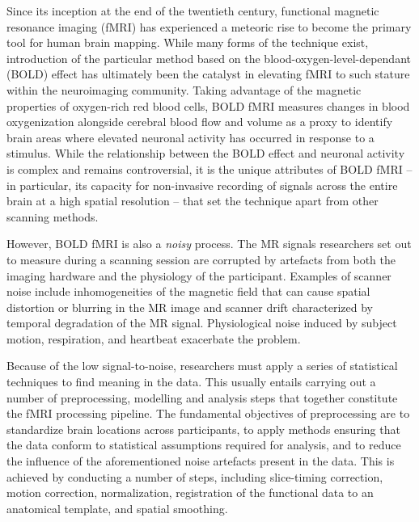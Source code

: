 Since its inception at the end of the twentieth century, functional magnetic resonance imaging (fMRI) has experienced a meteoric rise to become the primary tool for human brain mapping. While many forms of the technique exist, introduction of the particular method based on the blood-oxygen-level-dependant (BOLD) effect has ultimately been the catalyst in elevating fMRI to such stature within the neuroimaging community. Taking advantage of the magnetic properties of oxygen-rich red blood cells, BOLD fMRI measures changes in blood oxygenization alongside cerebral blood flow and volume as a proxy to identify brain areas where elevated neuronal activity has occurred in response to a stimulus. While the relationship between the BOLD effect and neuronal activity is complex and remains controversial, it is the unique attributes of BOLD fMRI -- in particular, its capacity for non-invasive recording of signals across the entire brain at a high spatial resolution -- that set the technique apart from other scanning methods.

However, BOLD fMRI is also a \textit{noisy} process. The MR signals researchers set out to measure during a scanning session are corrupted by artefacts from both the imaging hardware and the physiology of the participant. Examples of scanner noise include inhomogeneities of the magnetic field that can cause spatial distortion or blurring in the MR image and scanner drift characterized by temporal degradation of the MR signal. Physiological noise induced by subject motion, respiration, and heartbeat exacerbate the problem. 

Because of the low signal-to-noise, researchers must apply a series of statistical techniques to find meaning in the data. This usually entails carrying out a number of preprocessing, modelling and analysis steps that together constitute the fMRI processing pipeline. The fundamental objectives of preprocessing are to standardize brain locations across participants, to apply methods ensuring that the data conform to statistical assumptions required for analysis, and to reduce the influence of the aforementioned noise artefacts present in the data. This is achieved by conducting a number of steps, including slice-timing correction, motion correction, normalization, registration of the functional data to an anatomical template, and spatial smoothing. 

